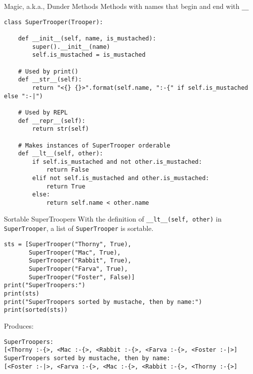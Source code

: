 \documentclass[smaller]{beamer}
\begin{document}
\begin{frame}[fragile,label=sec-1-9]{Magic, a.k.a., Dunder Methods}
 Methods with names that begin and end with \verb~__~

\lstset{language=Python,label= ,caption= ,numbers=none}
\begin{lstlisting}
class SuperTrooper(Trooper):

    def __init__(self, name, is_mustached):
        super().__init__(name)
        self.is_mustached = is_mustached

    # Used by print()
    def __str__(self):
        return "<{} {}>".format(self.name, ":-{" if self.is_mustached else ":-|")

    # Used by REPL
    def __repr__(self):
        return str(self)

    # Makes instances of SuperTrooper orderable
    def __lt__(self, other):
        if self.is_mustached and not other.is_mustached:
            return False
        elif not self.is_mustached and other.is_mustached:
            return True
        else:
            return self.name < other.name
\end{lstlisting}
\end{frame}

\begin{frame}[fragile,label=sec-1-10]{Sortable SuperTroopers}
 With the definition of \verb~__lt__(self, other)~ in \verb~SuperTrooper~, a list of \verb~SuperTrooper~ is sortable.

\lstset{language=Python,label= ,caption= ,numbers=none}
\begin{lstlisting}
sts = [SuperTrooper("Thorny", True),
       SuperTrooper("Mac", True),
       SuperTrooper("Rabbit", True),
       SuperTrooper("Farva", True),
       SuperTrooper("Foster", False)]
print("SuperTroopers:")
print(sts)
print("SuperTroopers sorted by mustache, then by name:")
print(sorted(sts))
\end{lstlisting}

Produces:

\lstset{language=sh,label= ,caption= ,numbers=none}
\begin{lstlisting}
SuperTroopers:
[<Thorny :-{>, <Mac :-{>, <Rabbit :-{>, <Farva :-{>, <Foster :-|>]
SuperTroopers sorted by mustache, then by name:
[<Foster :-|>, <Farva :-{>, <Mac :-{>, <Rabbit :-{>, <Thorny :-{>]
\end{lstlisting}
\end{frame}
\end{document}
